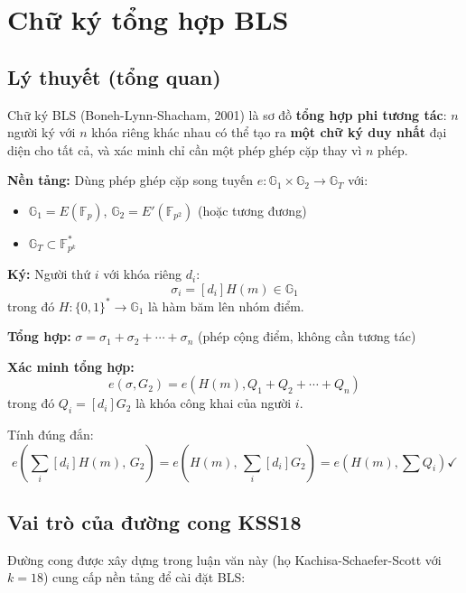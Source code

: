 \section{Chữ ký tổng hợp
BLS}\label{chux1eef-kuxfd-tux1ed5ng-hux1ee3p-bls}

\subsection{Lý thuyết (tổng
quan)}\label{luxfd-thuyux1ebft-tux1ed5ng-quan}

Chữ ký BLS (Boneh-Lynn-Shacham, 2001) \citep{BLS2001} là sơ đồ
\textbf{tổng hợp phi tương tác}: \(n\) người ký với \(n\) khóa riêng
khác nhau có thể tạo ra \textbf{một chữ ký duy nhất} đại diện cho tất
cả, và xác minh chỉ cần một phép ghép cặp thay vì \(n\) phép.

\textbf{Nền tảng:} Dùng phép ghép cặp song tuyến
\(e: \mathbb{G}_1 \times \mathbb{G}_2 \to \mathbb{G}_T\) với:

\begin{itemize}
\tightlist
\item
  \(\mathbb{G}_1 = E(\mathbb{F}_p)\),
  \(\mathbb{G}_2 = E'(\mathbb{F}_{p^2})\) (hoặc tương đương)
\item
  \(\mathbb{G}_T \subset \mathbb{F}_{p^k}^*\)
\end{itemize}

\textbf{Ký:} Người thứ \(i\) với khóa riêng \(d_i\):
\[\sigma_i = [d_i] H(m) \in \mathbb{G}_1\] trong đó
\(H: \{0,1\}^* \to \mathbb{G}_1\) là hàm băm lên nhóm điểm.

\textbf{Tổng hợp:} \(\sigma = \sigma_1 + \sigma_2 + \cdots + \sigma_n\)
(phép cộng điểm, không cần tương tác)

\textbf{Xác minh tổng hợp:}
\[e(\sigma, G_2) = e(H(m), Q_1 + Q_2 + \cdots + Q_n)\] trong đó
\(Q_i = [d_i]G_2\) là khóa công khai của người \(i\).

Tính đúng đắn:
\[e\!\left(\sum_i [d_i]H(m),\, G_2\right) = e\!\left(H(m),\, \sum_i [d_i]G_2\right) = e(H(m), \sum Q_i) \checkmark\]

\subsection{Vai trò của đường cong
KSS18}\label{vai-truxf2-cux1ee7a-ux111ux1b0ux1eddng-cong-kss18}

Đường cong được xây dựng trong luận văn này (họ Kachisa-Schaefer-Scott
với \(k = 18\)) \citep{CocksPinchK5K8} cung cấp nền tảng để cài đặt BLS:

